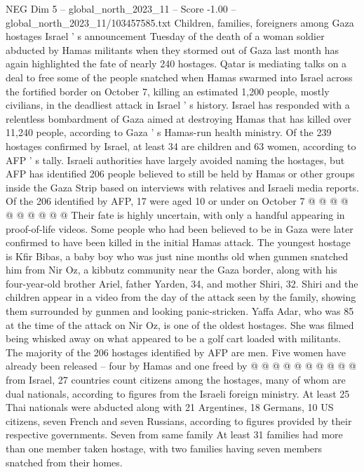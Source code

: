 \begin{textsample}{NEG Dim 5 – global\_north\_2023\_11 – Score -1.00 – global\_north\_2023\_11/103457585.txt}  \label{ex:f5_neg_031}
Children, families, foreigners among Gaza hostages Israel ' s announcement Tuesday of the death of a woman soldier abducted by Hamas militants when they stormed out of Gaza last month has again highlighted the fate of nearly 240 hostages.
Qatar is mediating talks on a deal to free some of the people snatched when Hamas swarmed into Israel across the fortified border on October 7, killing an estimated 1,200 people, mostly civilians, in the deadliest attack in Israel ' s history.
Israel has responded with a relentless bombardment of Gaza aimed at destroying Hamas that has killed over 11,240 people, according to Gaza ' s Hamas-run health ministry.
Of the 239 hostages confirmed by Israel, at least 34 are children and 63 women, according to AFP ' s tally.
Israeli authorities have largely avoided naming the hostages, but AFP has identified 206 people believed to still be held by Hamas or other groups inside the Gaza Strip based on interviews with relatives and Israeli media reports.
Of the 206 identified by AFP, 17 were aged 10 or under on October 7 @ @ @ @ @ @ @ @ @ @ Their fate is highly uncertain, with only a handful appearing in proof-of-life videos.
Some people who had been believed to be in Gaza were later confirmed to have been killed in the initial Hamas attack.
The youngest hostage is Kfir Bibas, a baby boy who was just nine months old when gunmen snatched him from Nir Oz, a kibbutz community near the Gaza border, along with his four-year-old brother Ariel, father Yarden, 34, and mother Shiri, 32.
Shiri and the children appear in a video from the day of the attack seen by the family, showing them surrounded by gunmen and looking panic-stricken.
Yaffa Adar, who was 85 at the time of the attack on Nir Oz, is one of the oldest hostages.
She was filmed being whisked away on what appeared to be a golf cart loaded with militants.
The majority of the 206 hostages identified by AFP are men.
Five women have already been released -- four by Hamas and one freed by @ @ @ @ @ @ @ @ @ @ from Israel, 27 countries count citizens among the hostages, many of whom are dual nationals, according to figures from the Israeli foreign ministry.
At least 25 Thai nationals were abducted along with 21 Argentines, 18 Germans, 10 US citizens, seven French and seven Russians, according to figures provided by their respective governments.
Seven from same family At least 31 families had more than one member taken hostage, with two families having seven members snatched from their homes.

\end{textsample}
